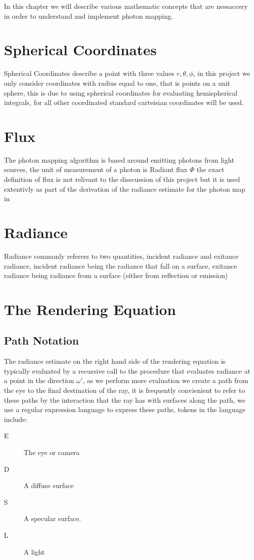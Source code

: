 In this chapter we will describe various mathematic concepts that are nessaccery in order to understand and implement photon mapping.

\section{Spherical Coordinates}
Spherical Coordinates describe a point with three values $r, \theta, \phi$, in this project we only consider coordinates with
radius equal to one, that is points on a unit sphere, this is due to using spherical coordinates for evaluating hemispherical
integrals, for all other coordinated standard carteisian coordinates will be used.


\section{Flux}
The photon mapping algorithm is based around emitting photons from light sources, the unit of measurement of a photon is
Radiant flux $\Phi$ the exact definition of flux is not relivant to the disscussion of this project but it is used extentivly
as part of the derivation of the radiance estimate for the photon map in 

\section{Radiance}
Radiance commonly referers to two quantities, incident radiance and exitance radiance, incident radiance being the radiance
that fall on a surface, exitance radiance being radiance from a surface (either from reflection or emission)

\section{The Rendering Equation}

\subsection{Path Notation}
The radiance estimate on the right hand side of the rendering equation is typically evaluated by a recursive call to the
procedure that evaluates radiance at a point in the direction $\omega'$, as we perform more evaluation we create a path
from the eye to the final destination of the ray, it is frequently convienient to refer to these paths by the interaction
that the ray has with surfaces along the path, we use a regular expression language to express these paths, tokens in the
language include:
\begin{description}
\item[E] The eye or camera
\item[D] A diffuse surface
\item[S] A specular surface.
\item[L] A light
\end{description}

